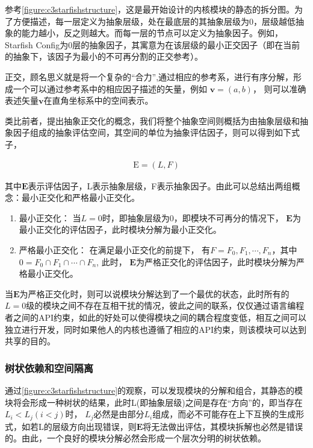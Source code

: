参考\autoref{figure:c3starfishstructure}，这是最开始设计的内核模块的静态的拆分图。为了方便描述，每一层定义为抽象层级，处在最底层的其抽象层级为0，层级越低抽象的能力越小，反之则越大。而每一层的节点可以定义为抽象因子。例如，Starfish Config为0层的抽象因子，其寓意为在该层级的最小正交因子（即在当前的抽象下，该因子为最小的不可再分割的正交参考）。

正交，顾名思义就是将一个复杂的“合力”,通过相应的参考系，进行有序分解，形成一个可以通过参考系中的相应因子描述的矢量，例如 $\boldsymbol {v}=(a, b)$， 则可以准确表述矢量$\boldsymbol {v}$在直角坐标系中的空间表示。

类比前者，提出抽象正交化的概念，我们将整个抽象空间则概括为由抽象层级和抽象因子组成的抽象评估空间，其空间的单位为抽象评估因子，则可以得到如下式子，


\begin{equation}
    \label{equation:c3elf}
    \begin{aligned}
       \boldsymbol{\mathrm{E}} = (L, F)
    \end{aligned}
\end{equation}

其中$\boldsymbol{E}$表示评估因子，L表示抽象层级，F表示抽象因子。由此可以总结出两组概念：最小正交化和严格最小正交化。

\begin{enumerate}
    \item 最小正交化： 当$L=0$时，即抽象层级为0，即模块不可再分的情况下， $\boldsymbol{E}$为最小正交化的评估因子，此时模块分解为最小正交化。
    \item 严格最小正交化： 在满足最小正交化的前提下， 有$F = {F_{0}, F_{1}, \cdots, F_{n}}$，其中$0 = {F_{0} \cap F_{1} \cap \cdots \cap F_{n}}$, 此时， $\boldsymbol{E}$为严格正交化的评估因子，此时模块分解为严格最小正交化。
\end{enumerate}

当$\boldsymbol{E}$为严格正交化时，则可以说模块分解达到了一个最优的状态，此时所有的$L=0$级的模块之间不存在互相干扰的情况，彼此之间的联系，仅仅通过语言编程者之间的API约束，如此的好处可以使得模块之间的耦合程度变低，相互之间可以独立进行开发，同时如果他人的内核也遵循了相应的API约束，则该模块可以达到共享的目的。


\subsubsection{树状依赖和空间隔离}


通过\autoref{figure:c3starfishstructure}的观察，可以发现模块的分解和组合，其静态的模块将会形成一种树状的结果，此时L(即抽象层级)之间是存在“方向”的，即当存在$L_{i} < L_{j} (i < j)$时， $L_{j}$必然是由部分$L_{i}$组成，而必不可能存在上下互换的生成形式，如若L的层级方向出现错误，则$\boldsymbol{E}$将无法做出评估，其模块拆解也必然是错误的。由此，一个良好的模块分解必然会形成一个层次分明的树状依赖。


